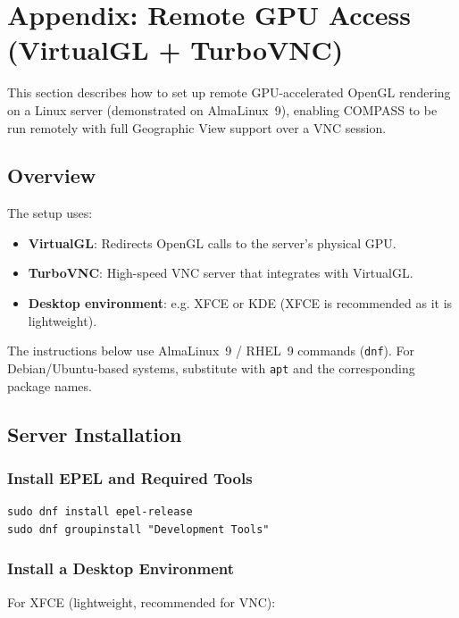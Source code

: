 \section{Appendix: Remote GPU Access (VirtualGL + TurboVNC)}
\label{sec:appendix_remote_gpu}

This section describes how to set up remote GPU-accelerated OpenGL rendering on a Linux server (demonstrated on AlmaLinux~9), enabling COMPASS to be run remotely with full Geographic View support over a VNC session.

\subsection{Overview}

The setup uses:

\begin{itemize}
\item \textbf{VirtualGL}: Redirects OpenGL calls to the server's physical GPU.
\item \textbf{TurboVNC}: High-speed VNC server that integrates with VirtualGL.
\item \textbf{Desktop environment}: e.g. XFCE or KDE (XFCE is recommended as it is lightweight).
\end{itemize}

The instructions below use AlmaLinux~9 / RHEL~9 commands (\texttt{dnf}). For Debian/Ubuntu-based systems, substitute with \texttt{apt} and the corresponding package names.

\subsection{Server Installation}

\subsubsection{Install EPEL and Required Tools}

\begin{lstlisting}
sudo dnf install epel-release
sudo dnf groupinstall "Development Tools"
\end{lstlisting}

\subsubsection{Install a Desktop Environment}

For XFCE (lightweight, recommended for VNC):

